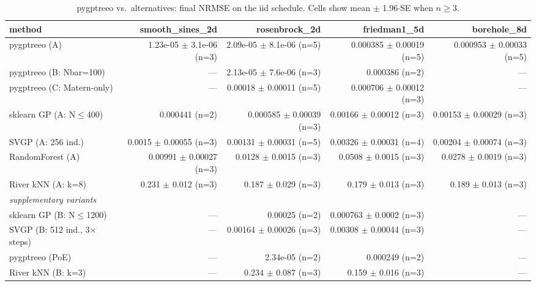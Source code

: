 
\begin{table}[h]
\centering
\caption{pygptreeo vs.\ alternatives: final NRMSE on the iid schedule. Cells show mean $\pm$ 1.96$\cdot$SE when $n\geq 3$.}
\begin{tabular}{lrrrr}
\toprule
method & smooth\_sines\_2d & rosenbrock\_2d & friedman1\_5d & borehole\_8d \\
\midrule
pygptreeo (A) & 1.23e-05 $\pm$ 3.1e-06 (n=3) & 2.09e-05 $\pm$ 8.1e-06 (n=5) & 0.000385 $\pm$ 0.00019 (n=5) & 0.000953 $\pm$ 0.00033 (n=5) \\
pygptreeo (B: Nbar=100) & --- & 2.13e-05 $\pm$ 7.6e-06 (n=3) & 0.000386 (n=2) & --- \\
pygptreeo (C: Matern-only) & --- & 0.00018 $\pm$ 0.00011 (n=5) & 0.000706 $\pm$ 0.00012 (n=3) & --- \\
sklearn GP (A: N$\leq$400) & 0.000441 (n=2) & 0.000585 $\pm$ 0.00039 (n=3) & 0.00166 $\pm$ 0.00012 (n=3) & 0.00153 $\pm$ 0.00029 (n=3) \\
SVGP (A: 256 ind.) & 0.0015 $\pm$ 0.00055 (n=3) & 0.00131 $\pm$ 0.00031 (n=5) & 0.00326 $\pm$ 0.00031 (n=4) & 0.00204 $\pm$ 0.00074 (n=3) \\
RandomForest (A) & 0.00991 $\pm$ 0.00027 (n=3) & 0.0128 $\pm$ 0.0015 (n=3) & 0.0508 $\pm$ 0.0015 (n=3) & 0.0278 $\pm$ 0.0019 (n=3) \\
River kNN (A: k=8) & 0.231 $\pm$ 0.012 (n=3) & 0.187 $\pm$ 0.029 (n=3) & 0.179 $\pm$ 0.013 (n=3) & 0.189 $\pm$ 0.013 (n=3) \\
\midrule
\multicolumn{5}{l}{\textit{supplementary variants}} \\
sklearn GP (B: N$\leq$1200) & --- & 0.00025 (n=2) & 0.000763 $\pm$ 0.0002 (n=3) & --- \\
SVGP (B: 512 ind., 3$\times$ steps) & --- & 0.00164 $\pm$ 0.00026 (n=3) & 0.00308 $\pm$ 0.00044 (n=3) & --- \\
pygptreeo (PoE) & --- & 2.34e-05 (n=2) & 0.000249 (n=2) & --- \\
River kNN (B: k=3) & --- & 0.234 $\pm$ 0.087 (n=3) & 0.159 $\pm$ 0.016 (n=3) & --- \\
\bottomrule
\end{tabular}
\end{table}

